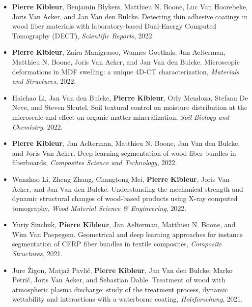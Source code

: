 \documentclass[oneside, english, 10pt, a4paper]{memoir}
\begin{document}
    \begin{itemize}    	    	
    	\item \textbf{Pierre Kibleur}, Benjamin Blykers, Matthieu N. Boone, Luc Van Hoorebeke, Joris Van Acker, and Jan Van den Bulcke. Detecting thin adhesive coatings in wood fiber materials with laboratory-based Dual-Energy Computed Tomography (DECT), \emph{Scientific Reports}, 2022.
    	
    	\item  {\textbf{Pierre Kibleur}, Zaira Manigrasso, Wannes Goethals, Jan Aelterman, Matthieu N. Boone, Joris Van Acker, and Jan Van den Bulcke}. {Microscopic deformations in MDF swelling: a unique 4D-CT characterization}, \emph{Materials and Structures}, 2022.
    	
    	\item Haichao Li, Jan Van den Bulcke, \textbf{Pierre Kibleur}, Orly Mendoza, Stefaan De Neve, and Steven Sleutel. Soil textural control on moisture distribution at the microscale and effect on organic matter mineralization, \emph{Soil Biology and Chemistry}, 2022.
    	
    	\item  {\textbf{Pierre Kibleur}, Jan Aelterman, Matthieu N. Boone, Jan Van den Bulcke, and Joris Van Acker}. {Deep learning segmentation of wood fiber bundles in fiberboards}, \emph{Composites Science and Technology},  2022.
    	
    	\item {Wanzhao Li, Zheng Zhang, Changtong Mei, \textbf{Pierre Kibleur}, Joris Van Acker, and Jan Van den Bulcke}. {Understanding the mechanical strength and dynamic structural changes of wood-based products using X-ray computed tomography}, \emph{Wood Material Science {\&} Engineering}, 2022.
    	
    	\item {Yuriy Sinchuk, \textbf{Pierre Kibleur}, Jan Aelterman, Matthieu N. Boone, and Wim Van Paepegem}. {Geometrical and deep learning approaches for instance segmentation of CFRP fiber bundles in textile composites}, \emph{Composite Structures}, 2021.
    	
    	\item {Jure \v{Z}}igon, Matja{\v{z}} Pavli{\v{c}}, \textbf{Pierre Kibleur}, Jan Van den Bulcke, Marko Petri{\v{c}}, Joris Van Acker, and Sebastian Dahle. {Treatment of wood with atmospheric plasma discharge: study of the treatment process, dynamic wettability and interactions with a waterborne coating}, \emph{{Holzforschung}}, 2021.
    	

\end{itemize}
\end{document}
